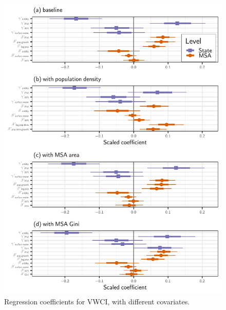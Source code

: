 \documentclass[draft]{agujournal}\usepackage{knitr}
\begin{document}
\begin{figure}
\includegraphics[width=6.25in]{figures_si/vwci_vars_cat_plots-1} \caption[Regression coefficients for VWCI, with different covariates]{Regression coefficients for VWCI, with different covariates.}\label{fig:vwci_vars_cat_plots}
\end{figure}



\end{document}
